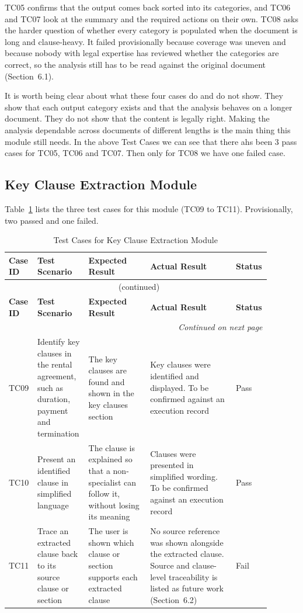 \documentclass[12pt,a4paper,oneside]{report}
\begin{document}
TC05 confirms that the output comes back sorted into its categories, and TC06 and TC07 look at the summary and the required actions on their own. TC08 asks the harder question of whether every category is populated when the document is long and clause-heavy. It failed provisionally because coverage was uneven and because nobody with legal expertise has reviewed whether the categories are correct, so the analysis still has to be read against the original document (Section~6.1).

It is worth being clear about what these four cases do and do not show. They show that each output category exists and that the analysis behaves on a longer document. They do not show that the content is legally right. Making the analysis dependable across documents of different lengths is the main thing this module still needs. In the above Test Cases we can see that there ahs been 3 pass cases for TC05, TC06 and TC07. Then only for TC08 we have one failed case.

\subsection{Key Clause Extraction Module}
Table~\ref{tab:clause} lists the three test cases for this module (TC09 to TC11). Provisionally, two passed and one failed.
{\footnotesize
\setlength{\tabcolsep}{3pt}
\renewcommand{\arraystretch}{1.15}
\begin{longtable}{|p{0.075\linewidth}|p{0.19\linewidth}|p{0.23\linewidth}|p{0.32\linewidth}|p{0.08\linewidth}|}
\caption{Test Cases for Key Clause Extraction Module}\label{tab:clause}\\
\hline
\textbf{Case ID} & \textbf{Test Scenario} & \textbf{Expected Result} & \textbf{Actual Result} & \textbf{Status}\\
\hline
\endfirsthead
\multicolumn{5}{c}{\tablename~\thetable{} (continued)}\\
\hline
\textbf{Case ID} & \textbf{Test Scenario} & \textbf{Expected Result} & \textbf{Actual Result} & \textbf{Status}\\
\hline
\endhead
\hline
\multicolumn{5}{r}{\emph{Continued on next page}}\\
\endfoot
\hline
\endlastfoot
TC09 & Identify key clauses in the rental agreement, such as duration, payment and termination & The key clauses are found and shown in the key clauses section & Key clauses were identified and displayed. To be confirmed against an execution record & Pass\\
\hline
TC10 & Present an identified clause in simplified language & The clause is explained so that a non-specialist can follow it, without losing its meaning & Clauses were presented in simplified wording. To be confirmed against an execution record & Pass\\
\hline
TC11 & Trace an extracted clause back to its source clause or section & The user is shown which clause or section supports each extracted clause & No source reference was shown alongside the extracted clause. Source and clause-level traceability is listed as future work (Section~6.2) & Fail\\
\end{longtable}
}
\end{document}
